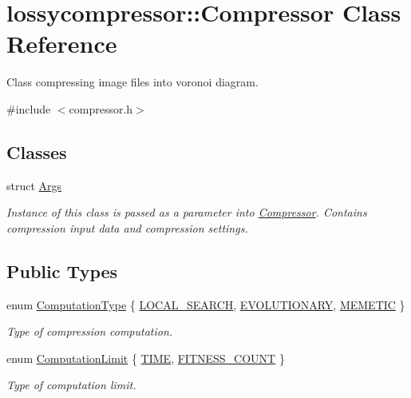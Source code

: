 \hypertarget{classlossycompressor_1_1_compressor}{}\section{lossycompressor\+:\+:Compressor Class Reference}
\label{classlossycompressor_1_1_compressor}


Class compressing image files into voronoi diagram.  




{\ttfamily \#include $<$compressor.\+h$>$}

\subsection*{Classes}
\begin{DoxyCompactItemize}
\item 
struct \hyperlink{structlossycompressor_1_1_compressor_1_1_args}{Args}
\begin{DoxyCompactList}\small\item\em Instance of this class is passed as a parameter into \hyperlink{classlossycompressor_1_1_compressor}{Compressor}. Contains compression input data and compression settings. \end{DoxyCompactList}\end{DoxyCompactItemize}
\subsection*{Public Types}
\begin{DoxyCompactItemize}
\item 
enum \hyperlink{classlossycompressor_1_1_compressor_a17846b94a7f3efe3f0a80b3b28ec46f0}{Computation\+Type} \{ \hyperlink{classlossycompressor_1_1_compressor_a17846b94a7f3efe3f0a80b3b28ec46f0a7f3d9f29eb63da8d5567faf6a4944932}{L\+O\+C\+A\+L\+\_\+\+S\+E\+A\+R\+CH}, 
\hyperlink{classlossycompressor_1_1_compressor_a17846b94a7f3efe3f0a80b3b28ec46f0a6994f8363a8579b541d51d3c32c9c80b}{E\+V\+O\+L\+U\+T\+I\+O\+N\+A\+RY}, 
\hyperlink{classlossycompressor_1_1_compressor_a17846b94a7f3efe3f0a80b3b28ec46f0ad4075402f113cb7d560706e9e31f8b8d}{M\+E\+M\+E\+T\+IC}
 \}\begin{DoxyCompactList}\small\item\em Type of compression computation. \end{DoxyCompactList}
\item 
enum \hyperlink{classlossycompressor_1_1_compressor_aae4947e887bbd9773bd2ceb47363d4f1}{Computation\+Limit} \{ \hyperlink{classlossycompressor_1_1_compressor_aae4947e887bbd9773bd2ceb47363d4f1a6c2b9861be5a84f05c0e591c83b4866e}{T\+I\+ME}, 
\hyperlink{classlossycompressor_1_1_compressor_aae4947e887bbd9773bd2ceb47363d4f1a64a6f90c051cbc0b5d5bd3838e17acbb}{F\+I\+T\+N\+E\+S\+S\+\_\+\+C\+O\+U\+NT}
 \}\begin{DoxyCompactList}\small\item\em Type of computation limit. \end{DoxyCompactList}
\end{DoxyCompactItemize}
